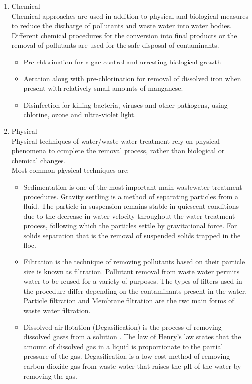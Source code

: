 \begin{enumerate}
\item Chemical\\

Chemical approaches are used in addition to physical and biological measures to reduce the discharge of pollutants and waste water into water bodies. Different chemical procedures for the conversion into final products or the removal of pollutants are used for the safe disposal of contaminants.\\
\begin{itemize}
\item Pre-chlorination for algae control and arresting biological growth.
\item Aeration along with pre-chlorination for removal of dissolved iron when present with relatively small amounts of manganese.
\item Disinfection for killing bacteria, viruses and other pathogens, using chlorine, ozone and ultra-violet light.
\end{itemize}
\item Physical\\
Physical techniques of water/waste water treatment rely on physical phenomena to complete the removal process, rather than biological or chemical changes.\\
Most common physical techniques are:\\
\begin{itemize}
\item Sedimentation is one of the most important main wastewater treatment procedures. Gravity settling is a method of separating particles from a fluid. The particle in suspension remains stable in quiescent conditions due to the decrease in water velocity throughout the water treatment process, following which the particles settle by gravitational force. For solids separation that is the removal of suspended solids trapped in the floc.
\item Filtration is the technique of removing pollutants based on their particle size is known as filtration. Pollutant removal from waste water permits water to be reused for a variety of purposes. The types of filters used in the procedure differ depending on the contaminants present in the water. Particle filtration and Membrane filtration are the two main forms of waste water filtration.
\item Dissolved air flotation (Degasification) is the process of removing dissolved gases from a solution . The law of Henry's law states that the amount of dissolved gas in a liquid is proportionate to the partial pressure of the gas. Degasification is a low-cost method of removing carbon dioxide gas from waste water that raises the pH of the water by removing the gas. 

\end{itemize}
\end{enumerate}
